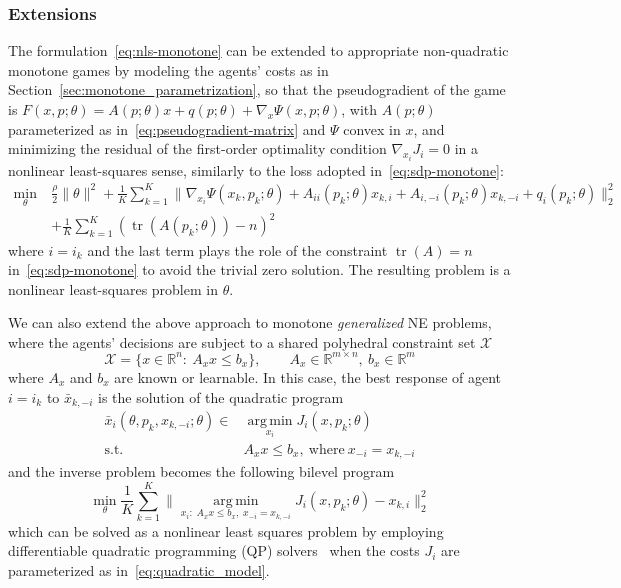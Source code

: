 \documentclass[11pt, a4paper]{article}
\newcommand{\rr}{\mathbb{R}}
\DeclareMathOperator{\tr}{\mathrm{tr}}
\theoremstyle{remark}
\theoremstyle{plain}
\begin{document}
\subsubsection{Extensions}
The formulation~\eqref{eq:nls-monotone} can be extended to appropriate non-quadratic monotone games by modeling the agents' costs as in Section~\ref{sec:monotone_parametrization}, so that the pseudogradient of the game is $F(x,p;\theta)=A(p;\theta)x+q(p;\theta)+\nabla_x\Psi(x,p;\theta)$, with $A(p;\theta)$ parameterized as in~\eqref{eq:pseudogradient-matrix} and $\Psi$ convex in $x$, and minimizing the residual of the first-order optimality condition $\nabla_{x_i} J_i = 0$ in a nonlinear least-squares sense, similarly to the loss adopted in~\eqref{eq:sdp-monotone}:
\begin{equation}
    \begin{aligned}
    \min_\theta\ &\frac{\rho}{2}\|\theta\|^2 + \frac{1}{K}\sum_{k=1}^{K} \Big\|
    \nabla_{x_i} \Psi(x_k,p_k;\theta)
    + A_{ii}(p_k;\theta) x_{k,i} + A_{i,-i}(p_k;\theta) x_{k,-i} + q_i(p_k;\theta)  \Big\|_2^2\\ &  +\frac{1}{K}\sum_{k=1}^{K}\left(\tr(A(p_k;\theta))-n\right)^2
    \end{aligned}
\label{eq:nls-nonquadratic}
\end{equation}
where $i=i_k$  and the last term 
plays the role of the constraint $\tr(A)=n$ in~\eqref{eq:sdp-monotone} to avoid the trivial zero solution. The resulting problem is a nonlinear least-squares problem in $\theta$.

We can also extend the above approach to  monotone {\it generalized} NE problems, where the agents' decisions are subject to a shared polyhedral constraint set $\mathcal{X}$ 
\begin{equation}
    \mathcal{X} =\bigl\{x \in \rr^{n}:\ A_x x \leq b_x\bigr\},
    \qquad A_x \in \rr^{m \times n},\ b_x \in \rr^{m}
\end{equation}
where $A_x$ and $b_x$ are known or learnable. In this case, the best response of agent $i=i_k$ to $\bar{x}_{k,-i}$ is the solution of the quadratic program
\begin{equation}
    \begin{aligned}
    \bar x_i(\theta, p_k, x_{k,-i};\theta) \in&
    \operatorname*{arg\,min}_{x_i} J_i(x,p_k;\theta)\\
    \textrm{s.t. }& A_x x \leq b_x,\ \mbox{where}\ x_{-i} = {x}_{k,-i}
    \end{aligned}
    \label{eq:inner-qp}
\end{equation}
and the inverse problem becomes the following bilevel program
\begin{equation}
    \min_{\theta} \frac{1}{K}\sum_{k=1}^{K}\Big\|
    \operatorname*{arg\,min}_{x_i:\; A_x x \leq b_x,\; x_{-i}={x}_{k,-i}} J_i(x,p_k;\theta)
    -{x}_{k,i}\Big\|_2^2
    \label{eq:bilevel-constrained}
\end{equation}
which can be solved as a nonlinear least squares problem by employing differentiable quadratic programming (QP) solvers~\cite{TM24,AABBDK19} when the costs $J_i$ are parameterized as in~\eqref{eq:quadratic_model}.
\end{document}
